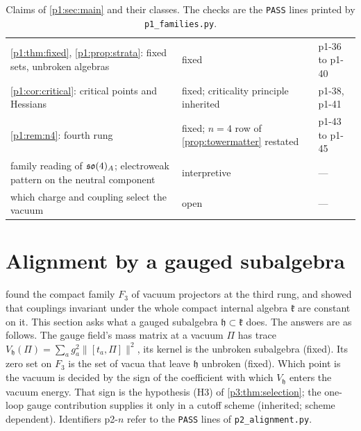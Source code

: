 \begin{table}[t]
\begin{tabular}{@{}>{\raggedright\arraybackslash}p{8.4cm}>{\raggedright\arraybackslash}p{4.3cm}>{\raggedright\arraybackslash}p{2.2cm}@{}}
\cref{p1:thm:fixed}, \cref{p1:prop:strata}: fixed sets, unbroken algebras & fixed & p1-36 to p1-40\\
\cref{p1:cor:critical}: critical points and Hessians & fixed; criticality principle inherited & p1-38, p1-41\\
\cref{p1:rem:n4}: fourth rung & fixed; $n=4$ row of \cref{prop:towermatter} restated & p1-43 to p1-45\\
family reading of $\mathfrak{so}(4)_A$; electroweak pattern on the neutral component & interpretive & ---\\
which charge and coupling select the vacuum & open & ---\\
\bottomrule
\end{tabular}
\caption{Claims of \cref{p1:sec:main} and their classes. The checks are the \texttt{PASS} lines printed by \texttt{p1\_families.py}.}
\label{p1:tab:claims}
\end{table}


\section{Alignment by a gauged subalgebra}
\label{p2:sec:main}

 found the compact family $F_3$ of vacuum projectors at the third rung, and showed that couplings invariant under the whole
compact internal algebra $\mathfrak k$ are constant on it. This section asks what a gauged subalgebra $\mathfrak h\subset\mathfrak k$ does. The answers are
as follows. The gauge field's mass matrix at a vacuum $\Pi$ has trace $V_{\mathfrak h}(\Pi)=\sum_ag_a^2\|[t_a,\Pi]\|^2$, its kernel is the unbroken
subalgebra (fixed). Its zero set on $F_3$ is the set of vacua that leave $\mathfrak h$ unbroken (fixed). Which point is the vacuum is decided by the sign of the
coefficient with which $V_{\mathfrak h}$ enters the vacuum energy. That sign is the hypothesis (H3) of \cref{p3:thm:selection}; the one-loop gauge contribution
supplies it only in a cutoff scheme (inherited; scheme dependent). Identifiers p2-$n$ refer to the \texttt{PASS} lines of
\texttt{p2\_alignment.py}.

